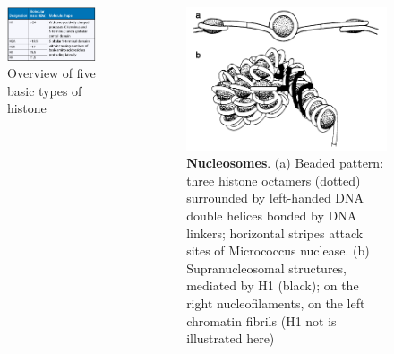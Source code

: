 \documentclass[11pt,dvipsnames,ignorenonframetext,aspectratio=169]{beamer}
\begin{document}
\begin{frame}{}
\protect\hypertarget{section-11}{}

\begin{columns}[T,onlytextwidth]
  
  
\begin{figure}
\includegraphics[width=0.65\linewidth]{../images/histone_types} \caption{Overview of five basic types of histone}\label{fig:histone-types}
\end{figure}


\begin{figure}
\includegraphics[width=0.8\linewidth]{../images/nucleosome_structure} \caption{\textbf{Nucleosomes}. (a) Beaded pattern: three histone octamers (dotted) surrounded by left-handed DNA double helices bonded by DNA linkers; horizontal stripes attack sites of Micrococcus nuclease. (b) Supranucleosomal structures, mediated by H1 (black); on the right nucleofilaments, on the left chromatin fibrils (H1 not is illustrated here)}\label{fig:nucleosome-structure}
\end{figure}

\end{columns}

\end{frame}
\end{document}
